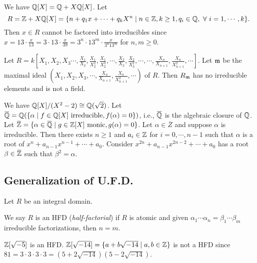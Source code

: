 \begin{example}
    We have $\mathbb{Q}[X] = \mathbb{Q} + X\mathbb{Q}[X]$. Let 
    \[R = \mathbb{Z} + X \mathbb{Q}[X] = \{n + q_1x + \cdots + q_kX^{n} \mid n \in \mathbb{Z}, k \geq 1, q_i \in \mathbb{Q},\ \forall \  i = 1,\cdots,k\}.\]
    Then $x \in R$ cannot be factored into irreducibles since $x = 13 \cdot \frac{x}{13} = 3 \cdot 13 \cdot \frac{x}{39} = 3^{n} \cdot 13^{m} \cdot \frac{x}{3^{n}13^{m}}$ for $n,m \geq 0$.
\end{example}

\begin{example}
    Let $R = k[X_1,X_2,X_3\cdots,\frac{X_1}{X_2},\frac{X_1}{X_2^{2}},\frac{X_1}{X_2^{3}},\cdots,\frac{X_2}{X_3},\frac{X_2}{X_3^{2}},\cdots,\cdots,\frac{X_n}{X_{n+1}},\frac{X_n}{X_{n+1}^{2}},\cdots]$. Let $\mathfrak{m}$ be the maximal ideal $(X_1,X_2,X_3,\cdots,\frac{X_n}{X_{n+1}},\frac{X_n}{X_{n+1}^{2}},\cdots)$ of $R$. Then $R_{\mathfrak{m}}$ has no irreducible elements and is not a field.
\end{example}

\begin{example}
    We have $\mathbb{Q}[X]/(X^{2}-2) \cong \mathbb{Q}(\sqrt 2)$. Let $\overbar{\bbQ} = \bbQ(\{\alpha \mid f \in \bbQ[X] \text{ irreducible}, f(\alpha) = 0\})$, i.e., $\overbar{\bbQ}$ is the algebraic closure of $\mathbb{Q}$. Let $\overbar{\bbZ} = \{\alpha \in \overbar{\bbQ} \mid g \in \bbZ[X] \text{ monic},g(\alpha) = 0\}$. Let $\alpha \in \overbar{Z}$ and suppose $\alpha$ is irreducible. Then there exists $n \geq 1$ and $a_i \in \mathbb{Z}$ for $i=0,\cdots,n-1$ such that $\alpha$ is a root of $x^{n} + a_{n-1}x^{n-1} + \cdots + a_0$. Consider $x^{2n} + a_{n-1}x^{2n-2} + \cdots + a_0$ has a root $\beta \in \overbar{\bbZ}$ such that $\beta^{2} = \alpha$.
\end{example}


\subsection*{Generalization of U.F.D.}

Let $R$ be an integral domain.

\begin{definition}
    We say $R$ is an HFD (\emph{half-factorial}) if $R$ is atomic and given $\alpha_1 \cdots \alpha_n = \beta_1 \cdots \beta_m$ irreducible factorizations, then $n = m$.
\end{definition}

\begin{example}
    $\mathbb{Z}[\sqrt {-5}]$ is an HFD. $\mathbb{Z}[\sqrt{-14}] = \{a+b\sqrt{-14} \mid a,b \in \mathbb{Z}\}$ is not a HFD since $81 = 3 \cdot 3 \cdot 3 \cdot 3 = (5+2\sqrt{-14})(5-2\sqrt{-14})$.
\end{example}

